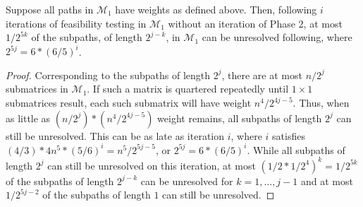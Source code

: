 \documentclass[12pt]{article}
\begin{document}
\begin{spacing}{3}
\begin{lemma}
\label{lem:resolved:paths}
Suppose all paths in $\mathcal{M}_1$ have weights as defined above. Then, following $i$ iterations of feasibility testing in $\mathcal{M}_1$ without an iteration of Phase $2$, at most $1/2^{5k}$ of the subpaths, of length $2^{j-k}$, in $\mathcal{M}_1$ can be unresolved following, where $2^{5j}=6*(6/5)^i$.
\end{lemma}
\begin{proof}
Corresponding to the subpaths of length $2^j$, there are at most $n/2^j$ submatrices in $\mathcal{M}_1$. If such a matrix is quartered repeatedly until $1\times1$ submatrices result, each such submatrix will have weight $n^4/2^{4j-5}$. Thus, when as little as $(n/2^j)*(n^4/2^{4j-5})$ weight remains, all subpaths of length $2^j$ can still be unresolved. This can be as late as iteration $i$, where $i$ satisfies $(4/3)*4n^5*(5/6)^i=n^5/2^{5j-5}$, or $2^{5j}=6*(6/5)^i$. While all subpaths of length $2^j$ can still be unresolved on this iteration, at most $(1/2*1/2^4)^k=1/2^{5k}$ of the subpaths of length $2^{j-k}$ can be unresolved for $k=1,\ldots,j-1$ and at most $1/2^{5j-2}$ of the subpaths of length $1$ can still be unresolved.
\end{proof}


\end{spacing}
\end{document}
